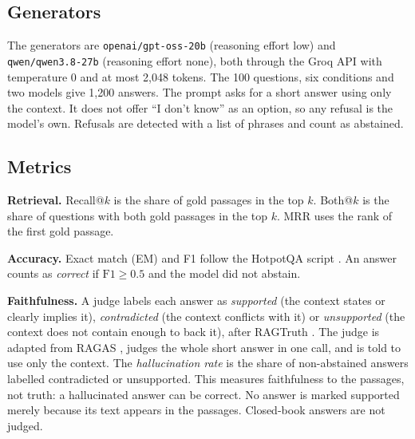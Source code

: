 \documentclass[10pt,a4paper,twocolumn]{article}
\newcommand{\model}[1]{\texttt{#1}}
\begin{document}
\subsection{Generators}
The generators are \model{openai/gpt-oss-20b} \cite{openai2025gptoss} (reasoning effort low) and
\model{qwen/qwen3.8-27b} \cite{qwen2026qwen38} (reasoning effort none), both through the Groq API with temperature 0 and at
most 2,048 tokens. The 100 questions, six conditions and two models give 1,200 answers. The prompt asks for a short answer
using only the context. It does not offer ``I don't know'' as an option, so any refusal is the model's own. Refusals are
detected with a list of phrases and count as abstained.

\subsection{Metrics}
\textbf{Retrieval.} Recall@$k$ is the share of gold passages in the top $k$. Both@$k$ is the share of questions with both
gold passages in the top $k$. MRR uses the rank of the first gold passage.

\textbf{Accuracy.} Exact match (EM) and F1 follow the HotpotQA script \cite{yang2018hotpotqa}. An answer counts as \emph{correct}
if $\text{F1}\geq0.5$ and the model did not abstain.

\textbf{Faithfulness.} A judge labels each answer as \emph{supported} (the context states or clearly implies it),
\emph{contradicted} (the context conflicts with it) or \emph{unsupported} (the context does not contain enough to back it), after
RAGTruth \cite{niu2024ragtruth}. The judge is adapted from RAGAS \cite{es2024ragas}, judges the whole short answer in one call, and is
told to use only the context. The \emph{hallucination rate} is the share of non-abstained answers labelled contradicted or
unsupported. This measures faithfulness to the passages, not truth: a hallucinated answer can be correct.
No answer is marked supported merely because its text appears in the passages. Closed-book answers are not judged.
\end{document}
